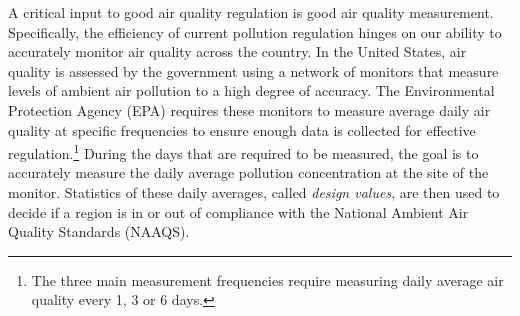 
  






A critical input to good air quality regulation is good air quality measurement.
%
Specifically, the efficiency of current pollution regulation hinges on our ability to accurately monitor air quality across the country.
%
In the United States, air quality is assessed by the government using a network of monitors that measure levels of ambient air pollution to a high degree of accuracy.
%
The Environmental Protection Agency (EPA) requires these monitors to measure average daily air quality at specific frequencies to ensure enough data is collected for effective regulation.\footnote{The three main measurement frequencies require measuring daily average air quality every 1, 3 or 6 days.}
%
During the days that are required to be measured, the goal is to accurately measure the daily average pollution concentration at the site of the monitor.
%
Statistics of these daily averages, called \textit{design values}, are then used to decide if a region is in or out of compliance with the National Ambient Air Quality Standards (NAAQS).


